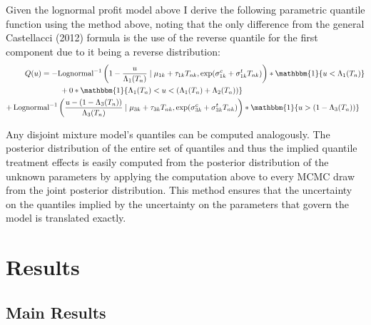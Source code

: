 \documentclass[AER]{AEA}
\begin{document}
 Given the lognormal profit model above I derive the following parametric quantile function using the method above, noting that the only difference from the general Castellacci (2012) formula is the use of the reverse quantile for the first component due to it being a reverse distribution:
\begin{equation}
\begin{aligned}
Q(u) = -&\text{Lognormal}^{-1}\left( 1-  \frac{u}{\Lambda_{1}(T_n)} \mid \mu_{1k} + \tau_{1k}T_{nk} ,  \exp(\sigma^{c}_{1k} + \sigma^{t}_{1k} T_{nk}) \right)* \mathbbm{1}\{ u < \Lambda_{1}(T_n)\} \\
 &\;+ 0*  \mathbbm{1}\{ \Lambda_1(T_n) < u < (\Lambda_{1}(T_n) +\Lambda_{2}(T_{n}))\} \\
+ \,\text{Lognormal}^{-1}&\left(   \frac{u - (1 - \Lambda_3(T_n))}{\Lambda_{3}(T_n)} \mid \mu_{3k} + \tau_{3k}T_{nk} ,  \exp(\sigma^{c}_{3k} + \sigma^{t}_{3k} T_{nk}) \right)* \mathbbm{1}\{ u >  (1-\Lambda_{3}(T_n))\}
\end{aligned} \end{equation}

Any disjoint mixture model's quantiles can be computed analogously.  The posterior distribution of the entire set of quantiles and thus the implied quantile treatment effects is easily computed from the posterior distribution of the unknown parameters by applying the computation above to every MCMC draw from the joint posterior distribution. This method ensures that the uncertainty on the quantiles implied by the uncertainty on the parameters that govern the model is translated exactly.



\section{Results}

\subsection{Main Results}
\end{document}
